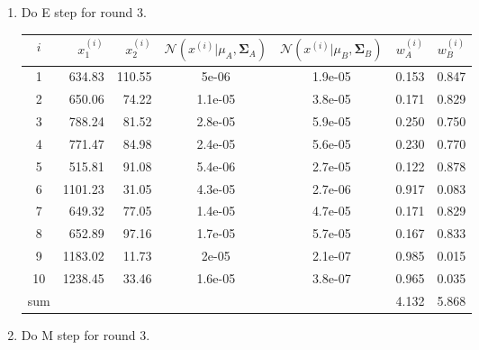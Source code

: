 \begin{enumerate}
\vspace{10mm}

\item Do E step for round 3.

\begin{center}
\small
\begin{tabular}{crrcccc}
\toprule
$i$ & $x_1^{(i)}$ & $x_2^{(i)}$ & $\mathcal{N}(x^{(i)}| \mu_A, \boldsymbol\Sigma_A)$ & $\mathcal{N}(x^{(i)}|\mu_B, \boldsymbol\Sigma_B)$ & $w_A^{(i)}$ & $w_B^{(i)}$ \\
\midrule
1 & 634.83 & 110.55 & 5e-06 & 1.9e-05 & 0.153 & 0.847 \\ 
  2 & 650.06 & 74.22 & 1.1e-05 & 3.8e-05 & 0.171 & 0.829 \\ 
  3 & 788.24 & 81.52 & 2.8e-05 & 5.9e-05 & 0.250 & 0.750 \\ 
  4 & 771.47 & 84.98 & 2.4e-05 & 5.6e-05 & 0.230 & 0.770 \\ 
  5 & 515.81 & 91.08 & 5.4e-06 & 2.7e-05 & 0.122 & 0.878 \\ 
  6 & 1101.23 & 31.05 & 4.3e-05 & 2.7e-06 & 0.917 & 0.083 \\ 
  7 & 649.32 & 77.05 & 1.4e-05 & 4.7e-05 & 0.171 & 0.829 \\ 
  8 & 652.89 & 97.16 & 1.7e-05 & 5.7e-05 & 0.167 & 0.833 \\ 
  9 & 1183.02 & 11.73 & 2e-05 & 2.1e-07 & 0.985 & 0.015 \\ 
  10 & 1238.45 & 33.46 & 1.6e-05 & 3.8e-07 & 0.965 & 0.035 \\
\midrule
sum & & & & & 4.132 & 5.868 \\
\bottomrule
\end{tabular}
\end{center}

\newpage

\item Do M step for round 3.


\end{enumerate}
